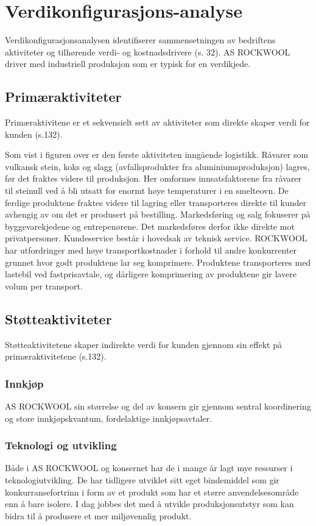 \section{Verdikonfigurasjons-analyse}
Verdikonfigurasjonsanalysen identifiserer sammensetningen av bedriftens aktiviteter og tilhørende verdi- og kostnadsdrivere (s. 32). AS ROCKWOOL driver med industriell produksjon som er typisk for en verdikjede.

\subsection{Primæraktiviteter}
Primæraktivitene er et sekvensielt sett av aktiviteter som direkte skaper verdi for kunden (s.132). 
 
\indent \newline
Som vist i figuren over er den første aktiviteten inngående logistikk. Råvarer som vulkansk stein, koks og slagg (avfallsprodukter fra aluminiumsproduksjon) lagres, før det fraktes videre til produksjon. Her omformes innsatsfaktorene fra råvarer til steinull ved å bli utsatt for enormt høye temperaturer i en smelteovn. De ferdige produktene fraktes videre til lagring eller transporteres direkte til kunder avhengig av om det er produsert på bestilling. Markedsføring og salg fokuserer på byggevarekjedene og entrepenørene. Det markedsføres derfor ikke direkte mot privatpersoner. Kundeservice består i hovedsak av teknisk service.
ROCKWOOL har utfordringer med høye transportkostnader i forhold til andre konkurrenter grunnet hvor godt produktene lar seg komprimere. Produktene transporteres med lastebil ved fastprisavtale, og dårligere komprimering av produktene gir lavere volum per transport. 

\subsection{Støtteaktiviteter}
Støtteaktivitetene skaper indirekte verdi for kunden gjennom sin effekt på primæraktivitetene (s.132). 

\subsubsection*{Innkjøp}
AS ROCKWOOL sin størrelse og del av konsern gir gjennom sentral koordinering og store innkjøpskvantum, fordelaktige innkjøpsavtaler.

\subsubsection*{Teknologi og utvikling}
Både i AS ROCKWOOL og konsernet har de i mange år lagt mye ressurser i teknologiutvikling. De har tidligere utviklet sitt eget bindemiddel som gir konkurransefortrinn i form av et produkt som har et større anvendelsesområde enn å bare isolere. I dag jobbes det med å utvikle produksjonsutstyr som kan bidra til å produsere et mer miljøvennlig produkt.


